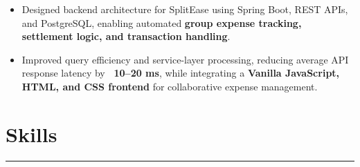 \documentclass[]{resume-openfont}
\begin{document}
\vspace{-2mm}
\begin{itemize}\itemsep-2pt
  \item Designed backend architecture for SplitEase using Spring Boot, REST APIs, and PostgreSQL, enabling automated \textbf{group expense tracking, settlement logic, and transaction handling}.
  \item Improved query efficiency and service-layer processing, reducing average API response latency by \textbf{~10--20 ms}, while integrating a \textbf{Vanilla JavaScript, HTML, and CSS frontend} for collaborative expense management.
\end{itemize}
\sectionsep

\vspace{-3mm}
\section{Skills}
\vspace{0mm}
\hrule
\vspace{3mm}
\begin{skillList}
    \\
    \\
    \\
    \\
\end{skillList}

\sectionsep

\end{document}
